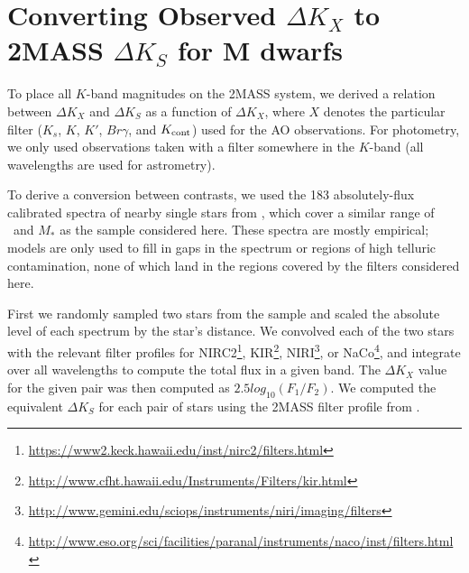 \documentclass[twocolumn]{aastex62}
\begin{document}




\appendix 
\section{Converting Observed $\Delta K_X$ to 2MASS $\Delta K_S$ for M dwarfs}\label{sec:a1}
To place all $K$-band magnitudes on the 2MASS system, we derived a relation between $\Delta K_X$ and $\Delta K_S$ as a function of $\Delta K_X$, where $X$ denotes the particular filter ($K_s$, $K$, $K'$, $Br\gamma$, and $K_{\rm{cont}}$) used for the AO observations. For photometry, we only used observations taken with a filter somewhere in the $K$-band (all wavelengths are used for astrometry).

To derive a conversion between contrasts, we used the 183 absolutely-flux calibrated spectra of nearby single stars from \citet{Mann2015b}, which cover a similar range of \teff\ and $M_*$ as the sample considered here. These spectra are mostly empirical; models are only used to fill in gaps in the spectrum or regions of high telluric contamination, none of which land in the regions covered by the filters considered here.

First we randomly sampled two stars from the sample and scaled the absolute level of each spectrum by the star's distance. We convolved each of the two stars with the relevant filter profiles for NIRC2\footnote{\href{https://www2.keck.hawaii.edu/inst/nirc2/filters.html}{https://www2.keck.hawaii.edu/inst/nirc2/filters.html}}, KIR\footnote{\href{http://www.cfht.hawaii.edu/Instruments/Filters/kir.html}{http://www.cfht.hawaii.edu/Instruments/Filters/kir.html}}, NIRI\footnote{\href{http://www.gemini.edu/sciops/instruments/niri/imaging/filters}{http://www.gemini.edu/sciops/instruments/niri/imaging/filters}}, or NaCo\footnote{\href{http://www.eso.org/sci/facilities/paranal/instruments/naco/inst/filters.html}{http://www.eso.org/sci/facilities/paranal/instruments/naco/inst/filters.html}}, and integrate over all wavelengths to compute the total flux in a given band. The $\Delta K_X$ value for the given pair was then computed as $2.5log_{10}(F_1/F_2)$. We computed the equivalent $\Delta K_S$ for each pair of stars using the 2MASS filter profile from \citet{2003AJ....126.1090C}.  
\end{document}
